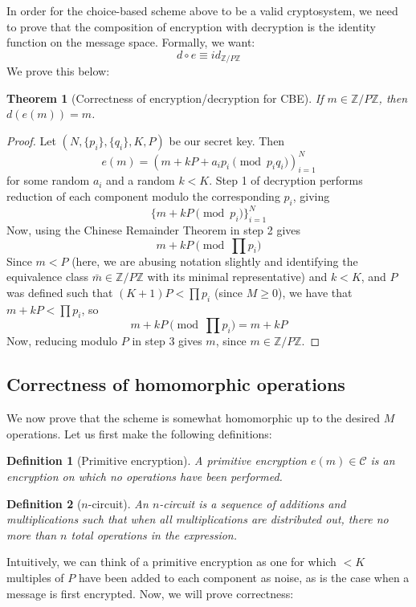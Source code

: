 \documentclass[11pt]{report}
\newtheorem{thm}{Theorem}
\newtheorem{definition}{Definition}
\newcommand{\ZP}{\mathbb{Z}/P\mathbb{Z}}
\begin{document}
In order for the choice-based scheme above to be a valid cryptosystem, we need to prove that the composition of encryption with decryption is the identity function on the message space. Formally, we want: \[d\circ e \equiv id_{\ZP}\] We prove this below:

\begin{thm}[Correctness of encryption/decryption for CBE]
If $m\in\ZP$, then $d(e(m)) = m$.
\end{thm}

\begin{proof}
Let $(N,\{p_i\},\{q_i\},K,P)$ be our secret key. Then
\[e(m) = (m+kP+a_ip_i \pmod{p_iq_i})_{i=1}^N\]
for some random $a_i$ and a random $k<K$. Step 1 of decryption performs reduction of each component modulo the corresponding $p_i$, giving
\[\{m+kP \pmod{p_i}\}_{i=1}^N \]
Now, using the Chinese Remainder Theorem in step 2 gives
\[ m+kP \pmod{\prod p_i} \]
Since $m<P$ (here, we are abusing notation slightly and identifying the equivalence class $\bar{m} \in \ZP$ with its minimal representative) and $k<K$, and $P$ was defined such that $(K+1)P <\prod p_i$ (since $M\geq 0$), we have that $m+kP <\prod p_i$, so
\[ m+kP \pmod{\prod p_i} = m+kP\]
Now, reducing modulo $P$ in step 3 gives $m$, since $m\in \ZP$.
\end{proof}


\subsection{Correctness of homomorphic operations}

We now prove that the scheme is somewhat homomorphic up to the desired $M$ operations. Let us first make the following definitions:

\begin{definition}[Primitive encryption]
A \emph{primitive encryption} $e(m) \in \mathcal{C}$ is an encryption on which no operations have been performed.
\end{definition}

\begin{definition}[$n$-circuit]
An \emph{$n$-circuit} is a sequence of additions and multiplications such that when all multiplications are distributed out, there no more than $n$ total operations in the expression.
\end{definition}

Intuitively, we can think of a primitive encryption as one for which $<K$ multiples of $P$ have been added to each component as noise, as is the case when a message is first encrypted. Now, we will prove correctness:
\end{document}
